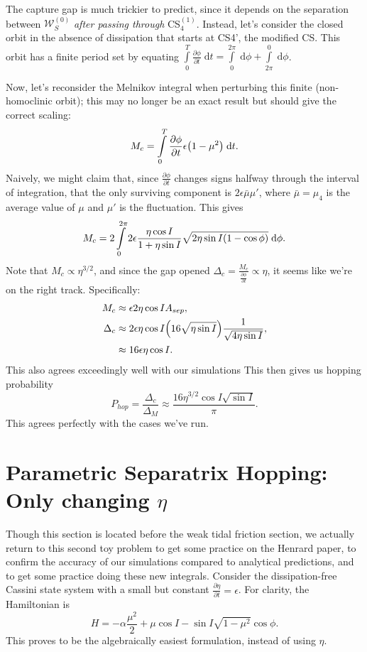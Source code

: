 \documentclass[11pt,
        usenames, %
        dvipsnames %
    ]{article}
\newcommand*{\pd}[2]{\frac{\partial#1}{\partial#2}}
\DeclarePairedDelimiter\p{\lparen}{\rparen}
\begin{document}
The capture gap is much trickier to predict, since it depends on the separation
between $\mathcal{W}^{(0)}_S$ \emph{after passing through} CS$_4^{(1)}$.
Instead, let's consider the closed orbit in the absence of dissipation that
starts at CS4', the modified CS\@. This orbit has a finite period set by
equating $\int\limits_0^T \pd{\phi}{t}\;\mathrm{d}t =
\int\limits_0^{2\pi}\;\mathrm{d}\phi + \int\limits_{2\pi}^0\;\mathrm{d}\phi$.

Now, let's reconsider the Melnikov integral when perturbing this finite
(non-homoclinic orbit); this may no longer be an exact result but should give
the correct scaling:
\begin{equation}
    M_c = \int\limits_0^T \pd{\phi}{t}\epsilon \p*{1 - \mu^2}\;\mathrm{d}t.
\end{equation}
Naively, we might claim that, since $\pd{\phi}{t}$ changes signs halfway through
the interval of integration, that the only surviving component is $2\epsilon
\bar{\mu}\mu'$, where $\bar{\mu} = \mu_4$ is the average value of $\mu$ and
$\mu'$ is the fluctuation. This gives
\begin{equation}
    M_c = 2\int\limits_0^{2\pi}2\epsilon \frac{\eta \cos I}{1 + \eta \sin I}
        \sqrt{2\eta \sin I \p*{1 - \cos \phi}}\;\mathrm{d}\phi.
\end{equation}
Note that $M_c \propto \eta^{3/2}$, and since the gap opened $\Delta_c =
\frac{M_c}{\pd{\phi}{t}} \propto \eta$, it seems like we're on the right track.
Specifically:
\begin{align}
    M_c &\approx \epsilon 2\eta \cos I A_{sep},\\
    \Delta_c &\approx 2\epsilon \eta \cos I \p*{16 \sqrt{\eta \sin I}}
        \frac{1}{\sqrt{4\eta \sin I}},\\
        &\approx 16\epsilon \eta \cos I.
\end{align}
This also agrees exceedingly well with our simulations This then gives us
hopping probability
\begin{equation}
    P_{hop} = \frac{\Delta_c}{\Delta_M} \approx
        \frac{16\eta^{3/2}\cos I \sqrt{\sin I}}{\pi}.
\end{equation}
This agrees perfectly with the cases we've run.

\section{Parametric Separatrix Hopping: Only changing $\eta$}\label{s:p2}

Though this section is located before the weak tidal friction section, we
actually return to this second toy problem to get some practice on the Henrard
paper, to confirm the accuracy of our simulations compared to analytical
predictions, and to get some practice doing these new integrals. Consider the
dissipation-free Cassini state system with a small but constant $\pd{\eta}{t} =
\epsilon$. For clarity, the Hamiltonian is
\begin{equation}
    H = -\alpha\frac{\mu^2}{2} +
        \mu \cos I - \sin I \sqrt{1 - \mu^2} \cos \phi.
\end{equation}
This proves to be the algebraically easiest formulation, instead of using
$\eta$.
\end{document}
